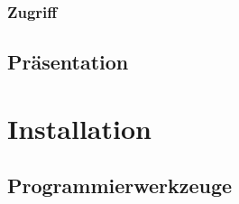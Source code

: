 \documentclass[12pt, oneside, a4paper]{article}		%
\begin{document}
\subsubsection{Zugriff}
\blindtext

\subsection{Präsentation}
\blindtext

\newpage

\section{Installation}



\subsection{Programmierwerkzeuge}
\end{document}
